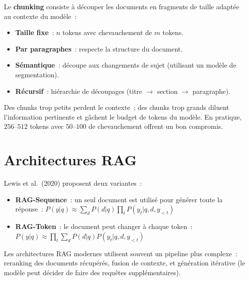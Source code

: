 \begin{definition}
Le \textbf{chunking} consiste \`a d\'ecouper les documents en fragments
de taille adapt\'ee au contexte du mod\`ele~:
\begin{itemize}
    \item \textbf{Taille fixe}~: $n$ tokens avec chevauchement de $m$ tokens.
    \item \textbf{Par paragraphes}~: respecte la structure du document.
    \item \textbf{S\'emantique}~: d\'ecoupe aux changements de sujet
    (utilisant un mod\`ele de segmentation).
    \item \textbf{R\'ecursif}~: hi\'erarchie de d\'ecoupages
    (titre $\to$ section $\to$ paragraphe).
\end{itemize}
\end{definition}

\begin{attention}[title=\textbf{Taille des chunks}]
Des chunks trop petits perdent le contexte~; des chunks trop grands
diluent l'information pertinente et g\^achent le budget de tokens du
mod\`ele. En pratique, $256$--$512$ tokens avec $50$--$100$ de chevauchement
offrent un bon compromis.
\end{attention}

\section{Architectures RAG}
\label{sec:rag:architectures}

\begin{definition}
Lewis et al.\ (2020) proposent deux variantes~:
\begin{itemize}
    \item \textbf{RAG-Sequence}~: un seul document est utilis\'e pour
    g\'en\'erer toute la r\'eponse~:
    $P(y|q) \approx \sum_{d} P(d|q) \prod_t P(y_t | q, d, y_{<t})$
    \item \textbf{RAG-Token}~: le document peut changer \`a chaque token~:
    $P(y|q) \approx \prod_t \sum_{d} P(d|q) P(y_t | q, d, y_{<t})$
\end{itemize}
\end{definition}

\begin{remarque}
Les architectures RAG modernes utilisent souvent un pipeline plus
complexe~: reranking des documents r\'ecup\'er\'es, fusion de contexte,
et g\'en\'eration it\'erative (le mod\`ele peut d\'ecider de faire des
requ\^etes suppl\'ementaires).
\end{remarque}

